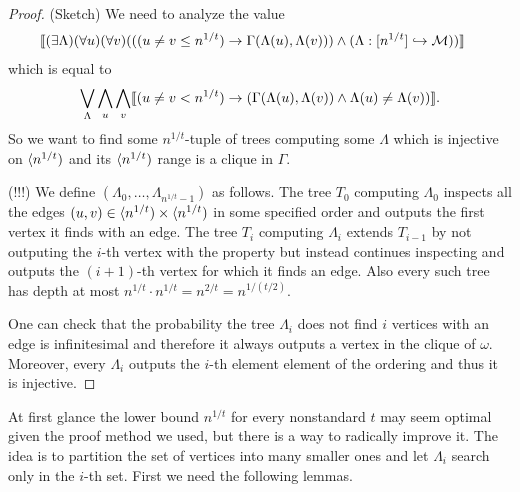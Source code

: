 \begin{proof}(Sketch) We need to analyze the value
\begin{align}
&\llbracket(\exists \Lambda)(\forall u)(\forall v)(((u\not = v \leq n^{1/t})\to\Gamma(\Lambda(u),\Lambda(v)))\land(\Lambda:[n^{1/t}]\hookrightarrow\mathcal{M}))\rrbracket
\end{align}
which is equal to
\begin{align}
\bigvee_\Lambda\bigwedge_u\bigwedge_v\llbracket(u\not=v < n^{1/t})\to(\Gamma(\Lambda(u),\Lambda(v))\land\Lambda(u)\not=\Lambda(v))\rrbracket.
\end{align}
So we want to find some $n^{1/t}$-tuple of trees computing some $\Lambda$ which is injective on $\langle n^{1/t})$ and its $\langle n^{1/t})$ range is a clique in $\Gamma$.

(!!!) We define $(\Lambda_0,\dots,\Lambda_{n^{1/t}-1})$ as follows. The tree $T_0$ computing $\Lambda_0$ inspects all the edges $(u,v)\in\langle n^{1/t})\times\langle n^{1/t})$ in some specified order and outputs the first vertex it finds with an edge. The tree $T_i$ computing $\Lambda_i$ extends $T_{i-1}$ by not outputing the $i$-th vertex with the property but instead continues inspecting and outputs the $(i+1)$-th vertex for which it finds an edge. Also every such tree has depth at most $n^{1/t}\cdot n^{1/t}=n^{2/t}=n^{1/(t/2)}$.

One can check that the probability the tree $\Lambda_i$ does not find $i$ vertices with an edge is infinitesimal and therefore it always outputs a vertex in the clique of $\omega$. Moreover, every $\Lambda_i$ outputs the $i$-th element element of the ordering and thus it is injective.
\end{proof}

At first glance the lower bound $n^{1/t}$ for every nonstandard $t$ may seem optimal given the proof method we used, but there is a way to radically improve it. The idea is to partition the set of vertices into many smaller ones and let $\Lambda_i$ search only in the $i$-th set. First we need the following lemmas.

